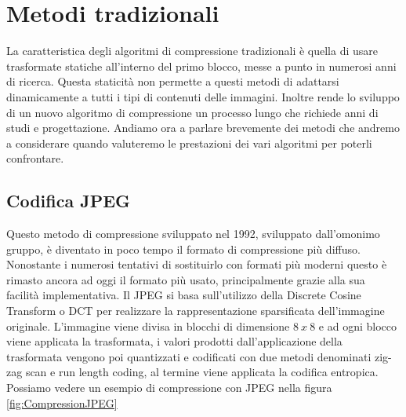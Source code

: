 \chapter{Metodi tradizionali}
La caratteristica degli algoritmi di compressione tradizionali è quella di usare trasformate statiche all’interno del primo blocco, messe a punto in numerosi anni di ricerca. Questa staticità non permette a questi metodi di adattarsi dinamicamente a tutti i tipi di contenuti delle immagini. Inoltre rende lo sviluppo di un nuovo algoritmo di compressione un processo lungo che richiede anni di studi e progettazione. \cite{cheng2018deep}
Andiamo ora a parlare brevemente dei metodi che andremo a considerare quando valuteremo le prestazioni dei vari algoritmi per poterli confrontare.

\section{Codifica JPEG}
Questo metodo di compressione sviluppato nel 1992, sviluppato dall'omonimo gruppo, è diventato in poco tempo il formato di compressione più diffuso. Nonostante i numerosi tentativi di sostituirlo con formati più moderni questo è rimasto ancora ad oggi il formato più usato, principalmente grazie alla sua facilità implementativa. Il JPEG si basa sull’utilizzo della Discrete Cosine Transform o DCT per realizzare la rappresentazione sparsificata dell’immagine originale. L'immagine viene divisa in blocchi di dimensione $8\:x\:8$ e ad ogni blocco viene applicata la trasformata, i valori prodotti dall'applicazione della trasformata vengono poi quantizzati e codificati con due metodi denominati zig-zag scan e run length coding, al termine viene applicata la codifica entropica. \cite{125072} \\
Possiamo vedere un esempio di compressione con JPEG nella figura \ref{fig:CompressionJPEG}

